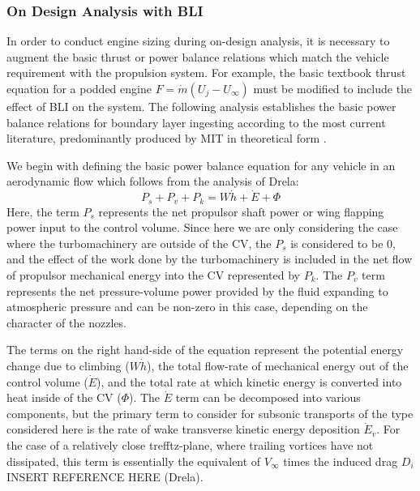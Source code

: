 			\subsubsection{\textbf{On Design Analysis with BLI}}
				In order to conduct engine sizing during on-design analysis, it is necessary to augment the basic thrust or power balance relations which match the vehicle requirement with the propulsion system.  For example, the basic textbook thrust equation for a podded engine $F = \dot{m}(U_j - U_\infty)$ must be modified to include the effect of BLI on the system.  The following analysis establishes the basic power balance relations for boundary layer ingesting according to the most current literature, predominantly produced by MIT in theoretical form \cite{Drela2009}.	
		
				We begin with defining the basic power balance equation for any vehicle in an aerodynamic flow which follows from the analysis of Drela:
				\begin{equation}
					P_s + P_v + P_k = W\dot{h}+\dot{E} + \Phi
					\label{Power_Balance}
				\end{equation}%
				Here, the term $P_s$ represents the net propulsor shaft power or wing flapping power input to the control volume.  Since here we are only considering the case where the turbomachinery are outside of the CV, the $P_s$ is considered to be 0, and the effect of the work done by the turbomachinery is included in the net flow of propulsor mechanical energy into the CV represented by $P_k$.  The $P_v$ term represents the net pressure-volume power provided by the fluid expanding to atmospheric pressure and can be non-zero in this case, depending on the character of the nozzles.  
				
				\indent The terms on the right hand-side of the equation represent the potential energy change due to climbing ($W\dot{h}$), the total flow-rate of mechanical energy out of the control volume ($\dot{E}$), and the total rate at which kinetic energy is converted into heat inside of the CV ($\Phi$).  The $\dot{E}$ term can be decomposed into various components, but the primary term to consider for subsonic transports of the type considered here is the rate of wake transverse kinetic energy deposition $\dot{E}_v$.  For the case of a relatively close trefftz-plane, where trailing vortices have not dissipated, this term is essentially the equivalent of $V_\infty$ times the induced drag $D_i$ INSERT REFERENCE HERE (Drela).  
		
